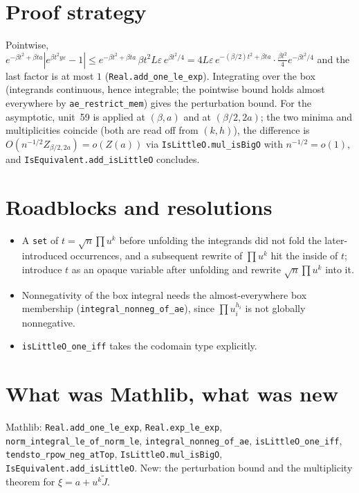 \documentclass[11pt]{article}
\begin{document}
\section{Proof strategy}
Pointwise, $e^{-\beta t^2+\beta ta}|e^{\beta t^2y\varepsilon}-1|\le e^{-\beta t^2+\beta ta}\,
\beta t^2L\varepsilon\,e^{\beta t^2/4}=4L\varepsilon\,e^{-(\beta/2)t^2+\beta ta}\cdot
\tfrac{\beta t^2}{4}e^{-\beta t^2/4}$ and the last factor is at most $1$
(\texttt{Real.add\_one\_le\_exp}). Integrating over the box (integrands continuous, hence
integrable; the pointwise bound holds almost everywhere by \texttt{ae\_restrict\_mem}) gives the
perturbation bound. For the asymptotic, unit~59 is applied at $(\beta,a)$ and at $(\beta/2,2a)$; the
two minima and multiplicities coincide (both are read off from $(k,h)$), the difference is
$O(n^{-1/2}Z_{\beta/2,2a})=o(Z(a))$ via \texttt{IsLittleO.mul\_isBigO} with
$n^{-1/2}=o(1)$, and \texttt{IsEquivalent.add\_isLittleO} concludes.

\section{Roadblocks and resolutions}
\begin{itemize}
\item A \texttt{set} of $t=\sqrt n\prod u^k$ before unfolding the integrands did not fold the
later-introduced occurrences, and a subsequent rewrite of $\prod u^k$ hit the inside of $t$; introduce
$t$ as an opaque variable after unfolding and rewrite $\sqrt n\prod u^k$ into it.
\item Nonnegativity of the box integral needs the almost-everywhere box membership
(\texttt{integral\_nonneg\_of\_ae}), since $\prod u_i^{h_i}$ is not globally nonnegative.
\item \texttt{isLittleO\_one\_iff} takes the codomain type explicitly.
\end{itemize}

\section{What was Mathlib, what was new}
Mathlib: \texttt{Real.add\_one\_le\_exp}, \texttt{Real.exp\_le\_exp}, \texttt{norm\_integral\_le\_of\_norm\_le},
\texttt{integral\_nonneg\_of\_ae}, \texttt{isLittleO\_one\_iff}, \texttt{tendsto\_rpow\_neg\_atTop},
\texttt{IsLittleO.mul\_isBigO}, \texttt{IsEquivalent.add\_isLittleO}. New: the perturbation bound and
the multiplicity theorem for $\xi=a+u^k\tilde J$.
\end{document}
